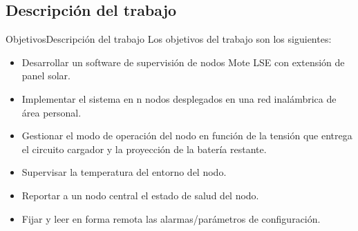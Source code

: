 \documentclass[aspectratio=169, handout]{beamer}
\begin{document}
\subsection[Objetivos]{Descripción del trabajo}
\begin{frame}{Objetivos}{Descripción del trabajo}
\noindent Los objetivos del trabajo son los siguientes:
\begin{itemize}

	\item Desarrollar un software de supervisión de nodos Mote LSE con extensión de panel solar.
	\item Implementar el sistema en n nodos desplegados en una red inalámbrica de área personal.
	\item Gestionar el modo de operación del nodo en función de la tensión que entrega el circuito cargador y la proyección de la batería restante.
	\item Supervisar la temperatura del entorno del nodo.
	\item Reportar a un nodo central el estado de salud del nodo.
	\item Fijar y leer en forma remota las alarmas/parámetros de configuración.
	 \end{itemize}	
\end{frame}

\end{document}
